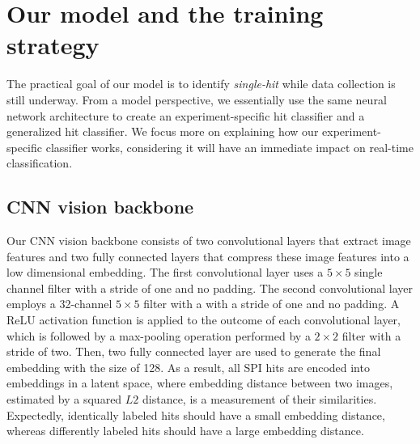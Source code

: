 




















\section{Our model and the training strategy}

The practical goal of our model is to identify \textit{single-hit} while data
collection is still underway.  From a model perspective, we essentially use the
same neural network architecture to create an experiment-specific hit classifier
and a generalized hit classifier.  We focus more on explaining how our
experiment-specific classifier works, considering it will have an immediate
impact on real-time classification.  


\subsection{CNN vision backbone}

Our CNN vision backbone consists of two convolutional layers that extract image
features and two fully connected layers that compress these image features into
a low dimensional embedding.  The first convolutional layer uses a $5 \times 5$
single channel filter with a stride of one and no padding.  The second
convolutional layer employs a 32-channel $5 \times 5$ filter with a with a
stride of one and no padding.  A ReLU activation function is applied to the
outcome of each convolutional layer, which is followed by a max-pooling
operation performed by a $2\times 2$ filter with a stride of two.  Then, two
fully connected layer are used to generate the final embedding with the size of
128.  As a result, all SPI hits are encoded into embeddings in a latent space,
where embedding distance between two images, estimated by a squared $L2$
distance, is a measurement of their similarities.  Expectedly, identically
labeled hits should have a small embedding distance, whereas differently labeled
hits should have a large embedding distance.  



